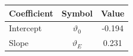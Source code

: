\begin{tabular}{lcc}
\hline\hline
Coefficient & Symbol & Value \\
\hline
Intercept & $\vartheta_0$ & -0.194 \\
Slope & $\vartheta_E$ & 0.231 \\
\hline
\end{tabular}